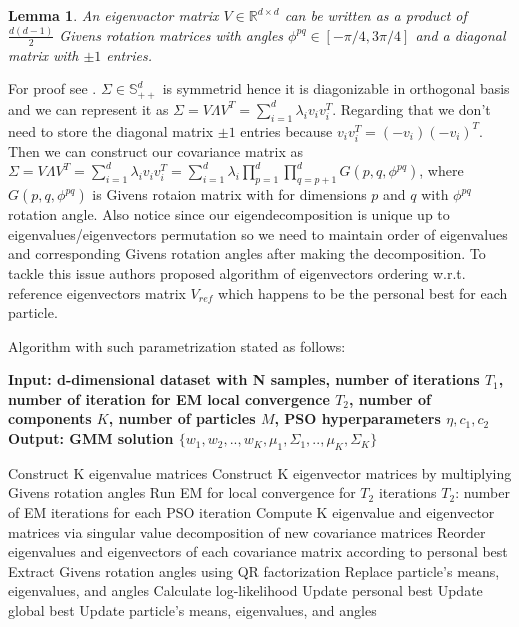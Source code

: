 \documentclass[a4paper]{article}
\newtheorem{lemma}{Lemma}
\begin{document}
\begin{lemma}
    An eigenvactor matrix $V \in \mathbb{R}^{d \times d}$ can be written as a product of $\frac{d(d-1)}{2}$
    Givens rotation matrices with angles $\phi^{pq} \in [-\pi/4, 3\pi/4]$ and a diagonal matrix with $\pm1$ entries.
\end{lemma}

 For proof see \cite{ARI20122804}. $\Sigma \in \mathbb{S}^d_{++}$ is symmetrid hence it is diagonizable in orthogonal 
 basis and we can represent it as  $\Sigma =V \Lambda V^T= \sum_{i=1}^d\lambda_iv_iv_i^T$.
 Regarding  that we don't need to store the diagonal matrix $\pm 1$ entries 
 because $v_iv_i^T = (-v_i)(-v_i)^T$. Then we can construct our covariance matrix as 
 $\Sigma = V \Lambda V^T= \sum_{i=1}^d\lambda_iv_iv_i^T = \sum_{i=1}^d\lambda_i\prod_{p=1}^{d}\prod_{q=p+1}^{d}G(p, q, \phi^{pq})$,
  where $G(p, q, \phi^{pq})$ is Givens rotaion matrix with for dimensions $p$ and $q$ with $\phi^{pq}$ rotation angle.
  Also notice since our eigendecomposition is unique up to eigenvalues/eigenvectors permutation
   so we need to maintain order of eigenvalues and corresponding Givens rotation angles after making the decomposition.
   To tackle this issue authors proposed algorithm of eigenvectors ordering w.r.t. reference eigenvectors matrix $V_{ref}$
   which happens to be the personal best for each particle. 

    Algorithm with such parametrization stated as follows:
    \begin{algorithm}
   \caption{}\label{alg:cap}
   \hspace*{\algorithmicindent} \textbf{Input: d-dimensional dataset with N samples, number of iterations $T_1$, 
   number of iteration for EM local convergence $T_2$, number of components $K$, number of particles $M$,  
   PSO hyperparameters $\eta, c_1, c_2$} \\
   \hspace*{\algorithmicindent} \textbf{Output: GMM solution $\{w_1, w_2, .., w_K, \mu_1, \Sigma_1, .., \mu_K, \Sigma_K\}$} 
   \begin{algorithmic}

            \State Construct K eigenvalue matrices
            \State  Construct K eigenvector matrices by multiplying
            Givens rotation angles
            \State Run EM for local convergence for $T_2$ iterations {$T_2$:
            number of EM iterations for each PSO iteration}
            \State Compute K eigenvalue and eigenvector matrices via
            singular value decomposition of new covariance matrices
            \State Reorder eigenvalues and eigenvectors of each
            covariance matrix according to personal best
            \State Extract Givens rotation angles using QR factorization
            \State Replace particle’s means, eigenvalues, and angles
            \State Calculate log-likelihood
            \State Update personal best
        \EndFor
        \State Update global best
            \State Update particle’s means, eigenvalues, and angles
        \EndFor
    \EndFor
    \end{algorithmic}
    \end{algorithm}
\end{document}
